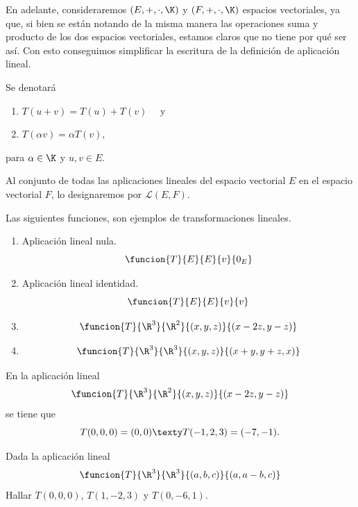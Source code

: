 \documentclass[compacto,10pt]{pubciencias-notas}
\begin{document}
\begin{obs}
En adelante, consideraremos $(E,+,\cdot,\K)$ y $(F,+,\cdot,\K)$ espacios vectoriales, ya que, si bien se están notando de la misma manera las operaciones suma y producto de los dos espacios vectoriales, estamos claros que no tiene por qué ser así. Con esto conseguimos simplificar la escritura de la definición de aplicación lineal.
\end{obs}

\begin{advertencia}
    Se denotará
    \begin{enumerate}
    \item 
        $T(u + v) = T(u) + T(v)\quad$ y
    \item 
        $T(\alpha v ) = \alpha T(v)$,
    \end{enumerate}
    para $\alpha \in \K$ y $u,v \in E$.
\end{advertencia}

\begin{obs}
    Al conjunto de todas las aplicaciones lineales del espacio vectorial $E$ en el espacio vectorial $F$, lo designaremos por $\mathscr{L}(E,F)$.
\end{obs}

\begin{ejem}\hspace{0pt} \label{ejem1}
Las siguientes funciones, son ejemplos de transformaciones lineales.
\begin{enumerate}
\item
    Aplicación lineal nula.
    \[
        \funcion{T}{E}{E}{v}{0_{E}}
    \]
\item
    Aplicación lineal identidad.
    \[
        \funcion{T}{E}{E}{v}{v}
    \]
    \item
    \[
        \funcion{T}{\R^3}{\R^2}{(x,y,z)}{(x-2z,y-z)}
    \]
      \item
    \[
        \funcion{T}{\R^3}{\R^3}{(x,y,z)}{(x + y,y + z,x)}
    \]
  
    
   
    
  
\end{enumerate}
\end{ejem}
\begin{ejem}
En la aplicaci\'on lineal
\[
        \funcion{T}{\R^3}{\R^2}{(x,y,z)}{(x-2z,y-z)}
\]
se tiene que
\[
    T(0,0,0)=(0,0) \texty T(-1,2,3)=(-7,-1).
\]
\end{ejem}

\begin{ejer}\label{Ejercicio1}
Dada la aplicaci\'on lineal 
    \[
        \funcion{T}{\R^3}{\R^3}{(a,b,c)}{(a,a-b,c)}
    \]
Hallar  $T(0,0,0)$, $T(1,-2,3)$ y $T(0,-6,1)$.
\end{ejer}
\end{document}
